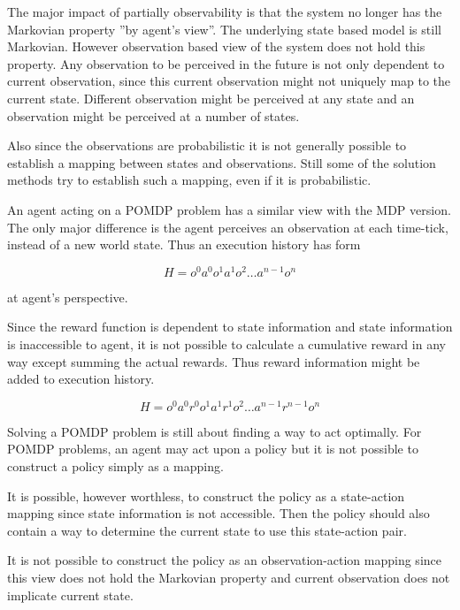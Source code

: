 The major impact of partially observability is that the system no longer has the Markovian property ''by agent's view''. The underlying state based model is still Markovian. However observation based view of the system does not hold this property. Any observation to be perceived in the future is not only dependent to current observation, since this current observation might not uniquely map to the current state. Different observation might be perceived at any state and an observation might be perceived at a number of states.

Also since the observations are probabilistic it is not generally possible to establish a mapping between states and observations. Still some of the solution methods try to establish such a mapping, even if it is probabilistic.

An agent acting on a POMDP problem has a similar view with the MDP version. The only major difference is the agent perceives an observation at each time-tick, instead of a new world state. Thus an execution history has form

\begin{displaymath}
H = o^0a^0o^1a^1o^2 \ldots a^{n-1}o^n
\end{displaymath}

at agent's perspective.

Since the reward function is dependent to state information and state information is inaccessible to agent, it is not possible to calculate a cumulative reward in any way except summing the actual rewards. Thus reward information might be added to execution history.

\begin{displaymath}
H = o^0a^0r^0o^1a^1r^1o^2 \ldots a^{n-1}r^{n-1}o^n
\end{displaymath}

Solving a POMDP problem is still about finding a way to act optimally. For POMDP problems, an agent may act upon a policy but it is not possible to construct a policy simply as a mapping.

It is possible, however worthless, to construct the policy as a state-action mapping since state information is not accessible. Then the policy should also contain a way to determine the current state to use this state-action pair.

It is not possible to construct the policy as an observation-action mapping since this view does not hold the Markovian property and current observation does not implicate current state.

